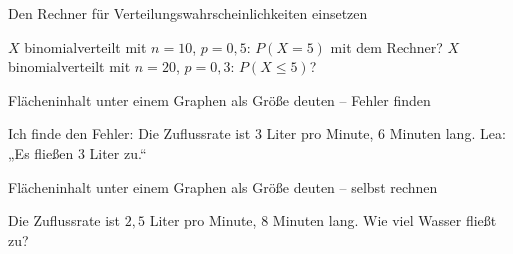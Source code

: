 \begin{aufgabe}{Den Rechner für Verteilungswahrscheinlichkeiten einsetzen}
\begin{teile}
\teil $X$ binomialverteilt mit $n = 10$, $p = 0{,}5$: $P(X = 5)$ mit dem Rechner? \leerfeld
\teil $X$ binomialverteilt mit $n = 20$, $p = 0{,}3$: $P(X \le 5)$? \leerfeld
\end{teile}
\end{aufgabe}

\begin{aufgabe}{Flächeninhalt unter einem Graphen als Größe deuten – Fehler finden}
\begin{teile}
\teil Ich finde den Fehler: Die Zuflussrate ist $3$ Liter pro Minute, $6$ Minuten lang. Lea: „Es fließen $3$ Liter zu.“
\end{teile}
\end{aufgabe}

\begin{aufgabe}{Flächeninhalt unter einem Graphen als Größe deuten – selbst rechnen}
\begin{teile}
\teil Die Zuflussrate ist $2{,}5$ Liter pro Minute, $8$ Minuten lang. Wie viel Wasser fließt zu? \leerfeld[l]
\end{teile}
\end{aufgabe}
